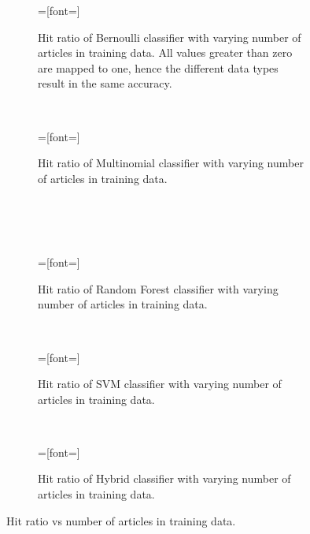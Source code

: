 \setlength{}
\setlength{}
\begin{figure}[H]
	\centering
	\begin{subfigure}[b]{\figwidth}
		=[font=\scriptsize]
		
		\caption{Hit ratio of Bernoulli classifier with varying number of articles in training data. All values greater than zero are mapped to one, hence the different data types result in the same accuracy.}
		\label{fig:hitratio-data-nb}
	\end{subfigure}
	~
	\begin{subfigure}[b]{\figwidth}
		=[font=\scriptsize]
		
		\caption{Hit ratio of Multinomial classifier with varying number of articles in training data.\\\ \\\ }
		\label{fig:hitratio-data-mn}
	\end{subfigure}
	\\
	\begin{subfigure}[b]{\figwidth}
		=[font=\scriptsize]
		
		\caption{Hit ratio of Random Forest classifier with varying number of articles in training data.}
		\label{fig:hitratio-data-rf}
	\end{subfigure}
	~
	\begin{subfigure}[b]{\figwidth}
		=[font=\scriptsize]
		
		\caption{Hit ratio of SVM classifier with varying number of articles in training data.}
		\label{fig:hitratio-data-svm}
	\end{subfigure}
	\\
	\begin{subfigure}[b]{\figwidth}
		=[font=\scriptsize]
		
		\caption{Hit ratio of Hybrid classifier with varying number of articles in training data.}
		\label{fig:hitratio-data-hybrid}
	\end{subfigure}
	\caption{Hit ratio vs number of articles in training data.}
	\label{fig:hitratio-data}
\end{figure}